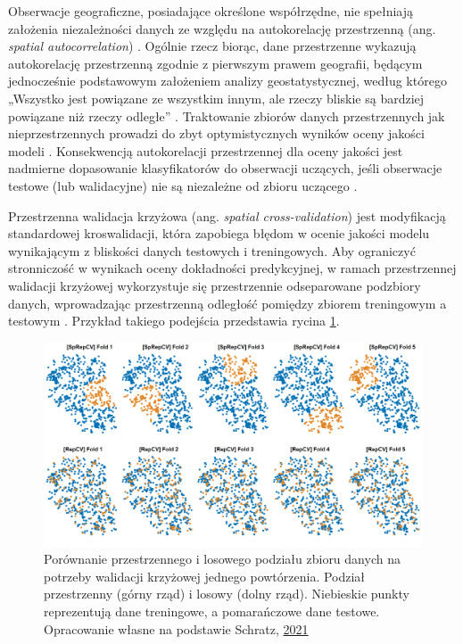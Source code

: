 \documentclass{amuthesis}
\begin{document}
Obserwacje geograficzne, posiadające określone współrzędne, nie
spełniają założenia niezależności danych ze względu na autokorelację
przestrzenną (ang. \emph{spatial autocorrelation})
\autocite{pohjankukka_2017_scv}. Ogólnie rzecz biorąc, dane przestrzenne
wykazują autokorelację przestrzenną zgodnie z pierwszym prawem
geografii, będącym jednocześnie podstawowym założeniem analizy
geostatystycznej, według którego „Wszystko jest powiązane ze wszystkim
innym, ale rzeczy bliskie są bardziej powiązane niż rzeczy odległe''
\autocite{tobler_1970_first_law_of_geography}. Traktowanie zbiorów
danych przestrzennych jak nieprzestrzennych prowadzi do zbyt
optymistycznych wyników oceny jakości modeli
\autocite{brenning_2005_scv}. Konsekwencją autokorelacji przestrzennej
dla oceny jakości jest nadmierne dopasowanie klasyfikatorów do
obserwacji uczących, jeśli obserwacje testowe (lub walidacyjne) nie są
niezależne od zbioru uczącego \autocite{brenning_2012_scv}.

Przestrzenna walidacja krzyżowa (ang. \emph{spatial cross-validation})
jest modyfikacją standardowej kroswalidacji, która zapobiega błędom w
ocenie jakości modelu wynikającym z bliskości danych testowych i
treningowych. Aby ograniczyć stronniczość w wynikach oceny dokładności
predykcyjnej, w ramach przestrzennej walidacji krzyżowej wykorzystuje
się przestrzennie odseparowane podzbiory danych, wprowadzając
przestrzenną odległość pomiędzy zbiorem treningowym a testowym
\autocite{pohjankukka_2017_scv}. Przykład takiego podejścia przedstawia
rycina \ref{fig-rycina-spcv}.

\begin{figure}[t]

{\centering \includegraphics[width=1\textwidth,height=\textheight]{figures/spcv_plot.png}

}

\caption{\label{fig-rycina-spcv}Porównanie przestrzennego i losowego
podziału zbioru danych na potrzeby walidacji krzyżowej jednego
powtórzenia. Podział przestrzenny (górny rząd) i losowy (dolny rząd).
Niebieskie punkty reprezentują dane treningowe, a pomarańczowe dane
testowe. Opracowanie własne na podstawie Schratz,
\href{https://mlr.mlr-org.com/articles/tutorial/handling_of_spatial_data.html}{2021}}

\end{figure}
\end{document}
